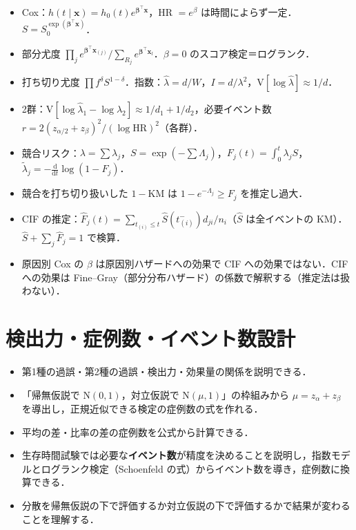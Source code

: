 \documentclass[a4paper,11pt,openany]{ltjsbook}
\newcommand{\V}{\mathrm{V}}
\newcommand{\dd}{\mathrm{d}}
\newcommand{\HR}{\mathrm{HR}}
\newcommand{\Normal}{\mathrm{N}}
\newcommand{\transp}{^{\top}}
\begin{document}
\begin{summarybox}
\begin{itemize}
\item Cox：$h(t\mid\bm x)=h_0(t)e^{\bm\beta\transp\bm x}$，HR $=e^\beta$ は時間によらず一定．$S=S_0^{\exp(\bm\beta\transp\bm x)}$．
\item 部分尤度 $\prod_j e^{\bm\beta\transp\bm x_{(j)}}/\sum_{R_j}e^{\bm\beta\transp\bm x_l}$．$\beta=0$ のスコア検定＝ログランク．
\item 打ち切り尤度 $\prod f^{\delta}S^{1-\delta}$．指数：$\hat\lambda=d/W$，$I=d/\lambda^2$，$\V[\log\hat\lambda]\approx1/d$．
\item 2群：$\V[\log\hat\lambda_1-\log\hat\lambda_2]\approx1/d_1+1/d_2$，必要イベント数 $r=2(z_{\alpha/2}+z_\beta)^2/(\log\HR)^2$（各群）．
\item 競合リスク：$\lambda=\sum\lambda_j$，$S=\exp(-\sum\Lambda_j)$，$F_j(t)=\int_0^t\lambda_jS$，$\tilde\lambda_j=-\frac{\dd}{\dd t}\log(1-F_j)$．
\item 競合を打ち切り扱いした $1-\mathrm{KM}$ は $1-e^{-\Lambda_j}\ge F_j$ を推定し過大．
\item CIF の推定：$\hat F_j(t)=\sum_{t_{(i)}\le t}\hat S(t_{(i)}^-)d_{ji}/n_i$（$\hat S$ は全イベントの KM）．$\hat S+\sum_j\hat F_j=1$ で検算．
\item 原因別 Cox の $\beta$ は原因別ハザードへの効果で CIF への効果ではない．CIF への効果は Fine--Gray（部分分布ハザード）の係数で解釈する（推定法は扱わない）．
\end{itemize}
\end{summarybox}

\chapter{検出力・症例数・イベント数設計}\label{ch:12}

\begin{goalbox}
\begin{itemize}
\item 第1種の過誤・第2種の過誤・検出力・効果量の関係を説明できる．
\item 「帰無仮説で $\Normal(0,1)$，対立仮説で $\Normal(\mu,1)$」の枠組みから $\mu=z_\alpha+z_\beta$ を導出し，正規近似できる検定の症例数の式を作れる．
\item 平均の差・比率の差の症例数を公式から計算できる．
\item 生存時間試験では必要な\textbf{イベント数}が精度を決めることを説明し，指数モデルとログランク検定（Schoenfeld の式）からイベント数を導き，症例数に換算できる．
\item 分散を帰無仮説の下で評価するか対立仮説の下で評価するかで結果が変わることを理解する．
\end{itemize}
\end{goalbox}
\end{document}
